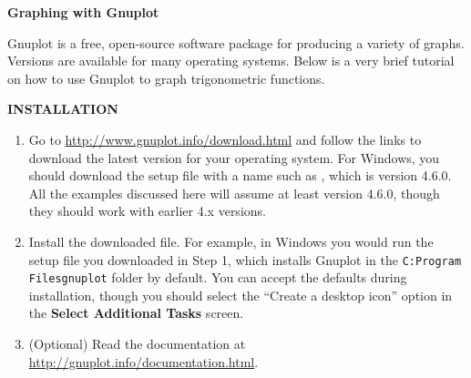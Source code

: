 \textsf{\textbf{\Large Graphing with Gnuplot}}\vspace{4mm}

Gnuplot is a free, open-source software package for producing a variety of graphs. Versions are
available for many operating systems. Below is a very brief tutorial on how to use Gnuplot to graph
trigonometric functions.\vspace{4mm}

\par\noindent\textbf{\textsf{INSTALLATION}}
\begin{enumerate}
 \item Go to \url{http://www.gnuplot.info/download.html} and follow the links to download the latest
  version for your operating system. For Windows, you should download the setup file with a name
  such as , which is
  version 4.6.0. All the examples discussed here will assume at least version 4.6.0, though they
  should work with earlier 4.x versions.
 \item Install the downloaded file. For example, in Windows you would run the setup file you
  downloaded in Step 1, which installs Gnuplot in the
  \texttt{C:Program Filesgnuplot} folder by default.
  You can accept the defaults during installation, though you
  should select the  ``Create a desktop icon'' option in the \textbf{Select Additional Tasks}
  screen.
 \item (Optional) Read the documentation at \url{http://gnuplot.info/documentation.html}.
\end{enumerate}

